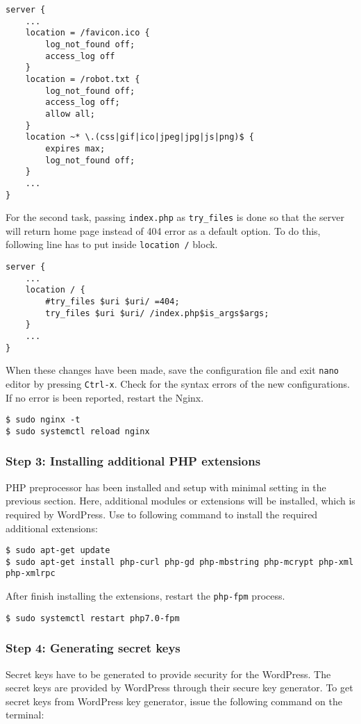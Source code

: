 \begin{lstlisting}
server {
	...
	location = /favicon.ico {
		log_not_found off;
		access_log off
	}
	location = /robot.txt {
		log_not_found off;
		access_log off;
		allow all;
	}
	location ~* \.(css|gif|ico|jpeg|jpg|js|png)$ {
		expires max;
		log_not_found off;
	}
	...
}
\end{lstlisting}

For the second task, passing \texttt{index.php} as \texttt{try\_files} is done so that the server will return home page instead of 404 error as a default option. To do this, following line has to put inside \texttt{location /} block.

\begin{lstlisting}
server {
	...
	location / {
		#try_files $uri $uri/ =404;
		try_files $uri $uri/ /index.php$is_args$args;
	}
	...
}
\end{lstlisting}

When these changes have been made, save the configuration file and exit \texttt{nano} editor by pressing \texttt{Ctrl-x}. Check for the syntax errors of the new configurations. If no error is been reported, restart the Nginx.

\begin{lstlisting}
$ sudo nginx -t
$ sudo systemctl reload nginx
\end{lstlisting}

\subsubsection*{Step 3: Installing additional PHP extensions}
PHP preprocessor has been installed and setup with minimal setting in the previous section. Here, additional modules or extensions will be installed, which is required by WordPress. Use to following command to install the required additional extensions:

\begin{lstlisting}
$ sudo apt-get update
$ sudo apt-get install php-curl php-gd php-mbstring php-mcrypt php-xml php-xmlrpc
\end{lstlisting}

After finish installing the extensions, restart the \texttt{php-fpm} process.
\begin{lstlisting}
$ sudo systemctl restart php7.0-fpm
\end{lstlisting}

\subsubsection*{Step 4: Generating secret keys}
Secret keys have to be generated to provide security for the WordPress. The secret keys are provided by WordPress through their secure key generator. To get secret keys from WordPress key generator, issue the following command on the terminal:

